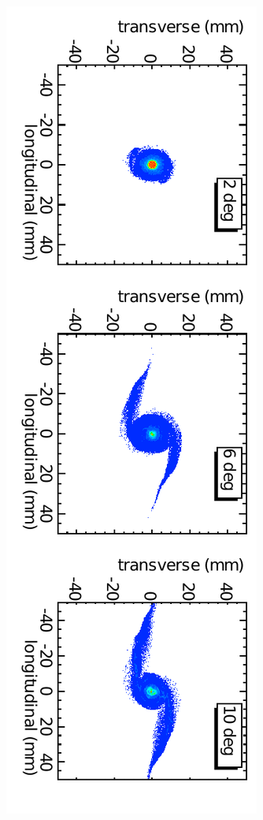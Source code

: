 \documentclass[aps,prstab,onecolumn,superscriptaddress,showpacs]{revtex4}
\begin{document}
\begin{figure}
  \includegraphics[angle=90,width=0.9\linewidth]{figures/Turn-50.pdf}

\end{figure}
\end{document}

